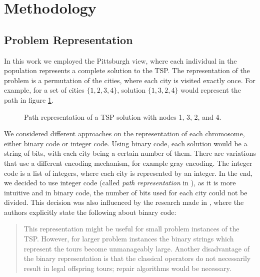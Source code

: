 \documentclass[11pt]{article}
\begin{document}
\section{Methodology}
\subsection{Problem Representation}
In this work we employed the Pittsburgh view, where each individual in the population represents a complete solution to the TSP. The representation of the problem is a permutation of the cities, where each city is visited exactly once. For example, for a set of cities $\{1,2,3,4\}$, solution $\{1,3,2,4\}$ would represent the path in figure \ref{fig:tsp_example}.

\begin{figure}[h]
    \centering
    \caption{Path representation of a TSP solution with nodes 1, 3, 2, and 4.}
    \label{fig:tsp_example}
\end{figure}


We considered different approaches on the representation of each chromosome, either binary code or integer code. Using binary code, each solution would be a string of bits, with each city being a certain number of them. There are variations that use a different encoding mechanism, for example gray encoding. The integer code is a list of integers, where each city is represented by an integer. In the end, we decided to use integer code (called \textit{path representation} in \cite{Larranaga1999}), as it is more intuitive and in binary code, the number of bits used for each city could not be divided. This decision was also influenced by the research made in \cite{Larranaga1999}, where the authors explicitly state the following about binary code:
\begin{quote}
This representation might be useful for small problem instances of the TSP.
However, for larger problem instances the binary strings which represent
the tours become unmanageably large. Another disadvantage of the binary
representation is that the classical operators do not necessarily result in legal
offspring tours; repair algorithms would be necessary.
\end{quote}
\end{document}
